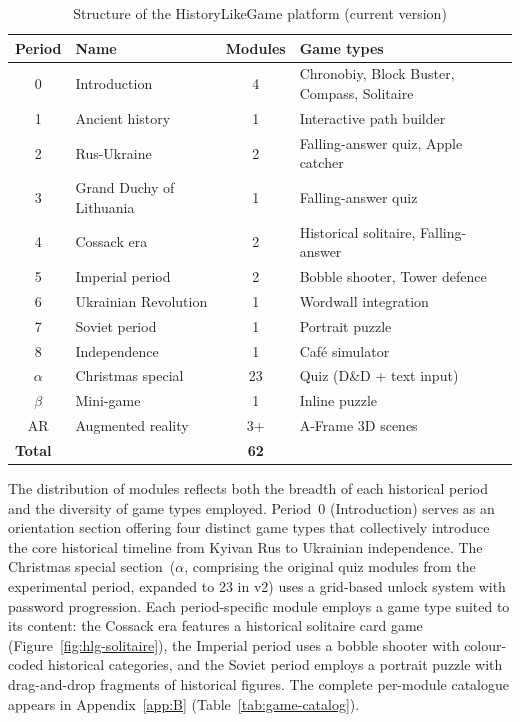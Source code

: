 \begin{table}[!h]
\centering
\caption{Structure of the HistoryLikeGame platform (current version)}
\label{tab:game-modules}
\small
\begin{tabular}{clcl}
\hline
\textbf{Period} & \textbf{Name} & \textbf{Modules} & \textbf{Game types} \\
\hline
0 & Introduction & 4 & Chronobiy, Block Buster, Compass, Solitaire \\
1 & Ancient history & 1 & Interactive path builder \\
2 & Rus-Ukraine & 2 & Falling-answer quiz, Apple catcher \\
3 & Grand Duchy of Lithuania & 1 & Falling-answer quiz \\
4 & Cossack era & 2 & Historical solitaire, Falling-answer \\
5 & Imperial period & 2 & Bobble shooter, Tower defence \\
6 & Ukrainian Revolution & 1 & Wordwall integration \\
7 & Soviet period & 1 & Portrait puzzle \\
8 & Independence & 1 & Caf\'{e} simulator \\
$\alpha$ & Christmas special & 23 & Quiz (D\&D + text input) \\
$\beta$ & Mini-game & 1 & Inline puzzle \\
AR & Augmented reality & 3+ & A-Frame 3D scenes \\
\hline
\multicolumn{2}{l}{\textbf{Total}} & \textbf{62} & \\
\hline
\end{tabular}
\end{table}

The distribution of modules reflects both the breadth of each historical period and the diversity of game types employed. Period~0 (Introduction) serves as an orientation section offering four distinct game types that collectively introduce the core historical timeline from Kyivan Rus to Ukrainian independence. The Christmas special section~($\alpha$, comprising the original quiz modules from the experimental period, expanded to 23 in v2) uses a grid-based unlock system with password progression. Each period-specific module employs a game type suited to its content: the Cossack era features a historical solitaire card game (Figure~\ref{fig:hlg-solitaire}), the Imperial period uses a bobble shooter with colour-coded historical categories, and the Soviet period employs a portrait puzzle with drag-and-drop fragments of historical figures. The complete per-module catalogue appears in Appendix~\ref{app:B} (Table~\ref{tab:game-catalog}).

